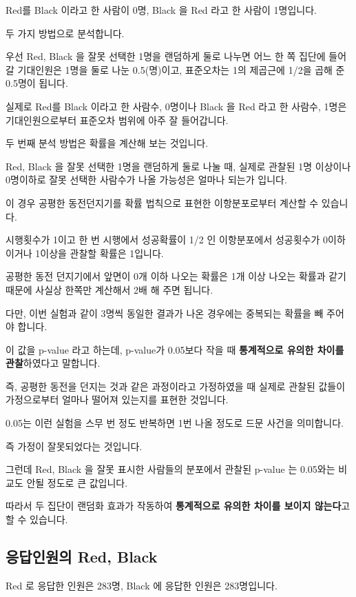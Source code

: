 \documentclass[
]{book}
\begin{document}
Red를 Black 이라고 한 사람이 0명, Black 을 Red 라고 한 사람이 1명입니다.

두 가지 방법으로 분석합니다.

우선 Red, Black 을 잘못 선택한 1명을 랜덤하게 둘로 나누면 어느 한 쪽 집단에 들어갈 기대인원은 1명을 둘로 나눈 0.5(명)이고, 표준오차는 1의 제곱근에 1/2을 곱해 준 0.5명이 됩니다.

실제로 Red를 Black 이라고 한 사람수, 0명이나 Black 을 Red 라고 한 사람수, 1명은 기대인원으로부터 표준오차 범위에 아주 잘 들어갑니다.

두 번째 분석 방법은 확률을 계산해 보는 것입니다.

Red, Black 을 잘못 선택한 1명을 랜덤하게 둘로 나눌 때, 실제로 관찰된 1명 이상이나 0명이하로 잘못 선택한 사람수가 나올 가능성은 얼마나 되는가 입니다.

이 경우 공평한 동전던지기를 확률 법칙으로 표현한 이항분포로부터 계산할 수 있습니다.

시행횟수가 1이고 한 번 시행에서 성공확률이 1/2 인 이항분포에서 성공횟수가 0이하이거나 1이상을 관찰할 확률은 1입니다.

공평한 동전 던지기에서 앞면이 0개 이하 나오는 확률은 1개 이상 나오는 확률과 같기 때문에 사실상 한쪽만 계산해서 2배 해 주면 됩니다.

다만, 이번 실험과 같이 3명씩 동일한 결과가 나온 경우에는 중복되는 확률을 빼 주어야 합니다.

이 값을 p-value 라고 하는데, p-value가 0.05보다 작을 때 \textbf{통계적으로 유의한 차이를 관찰}하였다고 말합니다.

즉, 공평한 동전을 던지는 것과 같은 과정이라고 가정하였을 때 실제로 관찰된 값들이 가정으로부터 얼마나 떨어져 있는지를 표현한 것입니다.

0.05는 이런 실험을 스무 번 정도 반복하면 1번 나올 정도로 드문 사건을 의미합니다.

즉 가정이 잘못되었다는 것입니다.

그런데 Red, Black 을 잘못 표시한 사람들의 분포에서 관찰된 p-value 는 0.05와는 비교도 안될 정도로 큰 값입니다.

따라서 두 집단이 랜덤화 효과가 작동하여 \textbf{통계적으로 유의한 차이를 보이지 않는다}고 할 수 있습니다.

\subsection{응답인원의 Red, Black}\label{uxc751uxb2f5uxc778uxc6d0uxc758-red-black-20}

Red 로 응답한 인원은 283명, Black 에 응답한 인원은 283명입니다.
\end{document}
